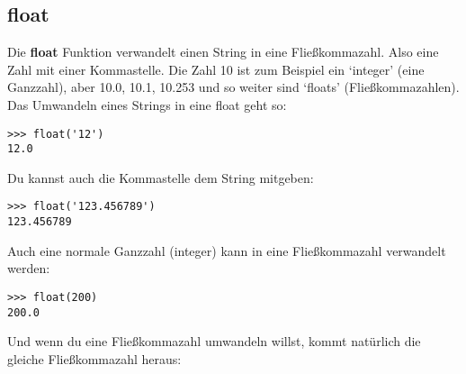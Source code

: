 \subsection*{float}

Die \textbf{float} Funktion verwandelt einen String in eine Fließkommazahl. Also eine Zahl mit einer Kommastelle. Die Zahl 10 ist zum Beispiel ein `integer' (eine Ganzzahl), aber 10.0, 10.1, 10.253 und so weiter sind `floats' (Fließkommazahlen). Das Umwandeln eines Strings in eine float geht so:

\begin{Verbatim}[frame=single]
>>> float('12')
12.0
\end{Verbatim}

\noindent
Du kannst auch die Kommastelle dem String mitgeben:

\begin{Verbatim}[frame=single]
>>> float('123.456789')
123.456789
\end{Verbatim}

\noindent
Auch eine normale Ganzzahl (integer) kann in eine Fließkommazahl verwandelt werden:

\begin{Verbatim}[frame=single]
>>> float(200)
200.0
\end{Verbatim}

\noindent
Und wenn du eine Fließkommazahl umwandeln willst, kommt natürlich die gleiche Fließkommazahl heraus:

